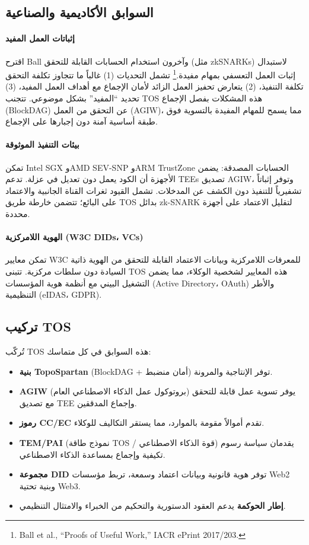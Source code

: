 \documentclass[11pt]{article}
\begin{document}
\subsection{السوابق الأكاديمية والصناعية}
\paragraph{إثباتات العمل المفيد} اقترح Ball وآخرون استخدام الحسابات القابلة للتحقق (مثل zkSNARKs) لاستبدال إثبات العمل التعسفي بمهام مفيدة.\footnote{Ball et al., ``Proofs of Useful Work,'' IACR ePrint 2017/203.} تشمل التحديات (1) غالباً ما تتجاوز تكلفة التحقق تكلفة التنفيذ، (2) يتعارض تحفيز العمل الزائد لأمان الإجماع مع أهداف العمل المفيد، (3) تحديد ``المفيد'' بشكل موضوعي. تتجنب TOS هذه المشكلات بفصل الإجماع (BlockDAG) عن التحقق من العمل (AGIW)، مما يسمح للمهام المفيدة بالتسوية فوق طبقة أساسية آمنة دون إجبارها على الإجماع.

\paragraph{بيئات التنفيذ الموثوقة} تمكن Intel SGX وAMD SEV-SNP وARM TrustZone الحسابات المصدقة: يضمن الأجهزة أن الكود يعمل دون تعديل في عزلة. تدعم TEEs تصديق AGIW، وتوفر إثباتاً تشفيرياً للتنفيذ دون الكشف عن المدخلات. تشمل القيود ثغرات القناة الجانبية والاعتماد على البائع؛ تتضمن خارطة طريق TOS بدائل zk-SNARK لتقليل الاعتماد على أجهزة محددة.

\paragraph{الهوية اللامركزية (W3C DIDs، VCs)} تمكن معايير W3C للمعرفات اللامركزية وبيانات الاعتماد القابلة للتحقق من الهوية ذاتية السيادة دون سلطات مركزية. تتبنى TOS هذه المعايير لشخصية الوكلاء، مما يضمن التشغيل البيني مع أنظمة هوية المؤسسات (Active Directory، OAuth) والأطر التنظيمية (eIDAS، GDPR).

\subsection{تركيب TOS}
تُركّب TOS هذه السوابق في كل متماسك:
\begin{itemize}[noitemsep]
  \item \textbf{بنية TopoSpartan} (BlockDAG + أمان منضبط) توفر الإنتاجية والمرونة.
  \item \textbf{AGIW} (بروتوكول عمل الذكاء الاصطناعي العام) يوفر تسوية عمل قابلة للتحقق مع تصديق TEE وإجماع المدققين.
  \item \textbf{رموز CC/EC} تقدم أموالاً مقومة بالموارد، مما يستقر التكاليف للوكلاء.
  \item \textbf{TEM/PAI} (نموذج طاقة TOS / قوة الذكاء الاصطناعي) يقدمان سياسة رسوم تكيفية وإجماع بمساعدة الذكاء الاصطناعي.
  \item \textbf{مجموعة DID} توفر هوية قانونية وبيانات اعتماد وسمعة، تربط مؤسسات Web2 وبنية تحتية Web3.
  \item \textbf{إطار الحوكمة} يدعم العقود الدستورية والتحكيم من الخبراء والامتثال التنظيمي.
\end{itemize}
\end{document}
